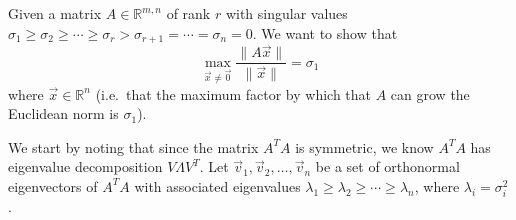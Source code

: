 

Given a matrix $A \in \mathbb{R}^{m,n}$ of rank $r$ with singular values $\sigma_{1} \geq \sigma_{2} \geq \cdots \geq \sigma_{r} > \sigma_{r+1} = \cdots = \sigma_{n} = 0$. We want to show that $$\max_{\vec{x} \neq \vec{0}} \frac{\|A\vec{x}\|}{\|\vec{x}\|} = \sigma_{1}$$ where $\vec{x} \in \mathbb{R}^{n}$ (i.e.~that the maximum factor by which that $A$ can grow the Euclidean norm is $\sigma_1$). 



We start by noting that since the matrix $A^{T}A$ is symmetric, we know $A^{T}A$ has eigenvalue decomposition $V \Lambda V^{T}.$ Let $\vec{v}_{1}, \vec{v}_{2}, \ldots, \vec{v}_{n}$ be a set of orthonormal eigenvectors of $A^{T}A$ with associated eigenvalues $\lambda_{1} \geq \lambda_{2} \geq \cdots \geq \lambda_{n}$, where $\lambda_i = \sigma_i^2$.


